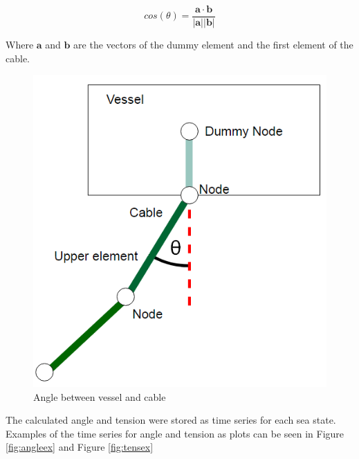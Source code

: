 \begin{equation}
    cos(\theta) = \frac{\boldsymbol{a \cdot b}}{|\boldsymbol{a}||\boldsymbol{b}| }
\end{equation}

Where $\boldsymbol{a}$ and $\boldsymbol{b}$ are the vectors of the dummy element and the first element of the cable. 

\begin{figure}[H]
\centering
\includegraphics[scale=0.5]{figures/angle}
\caption[Angle between vessel and cable ]{Angle between vessel and cable  }
 \label{fig:angle}
\end{figure}

\noindent The calculated angle and tension were stored as time series for each sea state. Examples of the time series for angle and tension as plots can be seen in Figure \ref{fig:angleex} and Figure \ref{fig:tensex}

